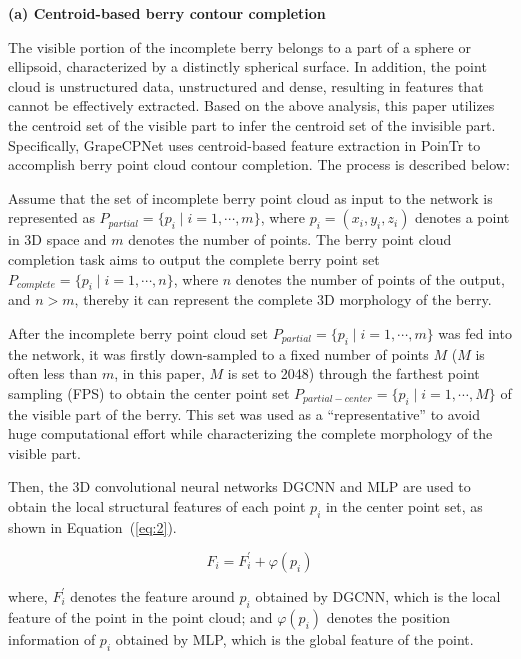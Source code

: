 \documentclass[12pt]{article}
\begin{document}
{\raggedright\textbf{(a) Centroid-based berry contour completion}}

The visible portion of the incomplete berry belongs to a part of a sphere or ellipsoid, characterized by a distinctly spherical surface. 
In addition, the point cloud is unstructured data, unstructured and dense, resulting in features that cannot be effectively extracted. 
Based on the above analysis, this paper utilizes the centroid set of the visible part to infer the centroid set of the invisible part. 
Specifically, GrapeCPNet uses centroid-based feature extraction in PoinTr \citep{yu_pointr_2021} to accomplish berry point cloud contour completion. The process is described below: 

Assume that the set of incomplete berry point cloud as input to the network is represented as $P_{partial}=\{p_i \mid i=1, \cdots, m \}$, where $p_i=(x_i,y_i,z_i)$ denotes a point in 3D space and $m$ denotes the number of points. 
The berry point cloud completion task aims to output the complete berry point set $P_{complete}=\{p_i \mid i=1, \cdots, n\}$, where $n$ denotes the number of points of the output, and $n > m$, thereby it can represent the complete 3D morphology of the berry.

After the incomplete berry point cloud set $P_{partial}=\{p_i \mid i=1,\cdots,m\}$ was fed into the network, it was firstly down-sampled to a fixed number of points $M$ ($M$ is often less than $m$, in this paper, $M$ is set to 2048) through the farthest point sampling (FPS) to obtain the center point set $P_{partial-center}=\{p_i \mid i=1, \cdots, M\}$ of the visible part of the berry. 
This set was used as a ``representative'' to avoid huge computational effort while characterizing the complete morphology of the visible part.

Then, the 3D convolutional neural networks DGCNN \citep{wang_dynamic_2019} and MLP \citep{tolstikhin_mlpmixer_2021} are used to obtain the local structural features of each point $p_i$ in the center point set, as shown in Equation~(\ref{eq:2}).

\begin{equation}
    F_i = F_{i}^{'} + \varphi(p_i)
    \label{eq:2}
\end{equation}

{\raggedright where, $F_{i}^{'}$ denotes the feature around $p_i$ obtained by DGCNN, which is the local feature of the point in the point cloud; and $\varphi(p_i)$ denotes the position information of $p_i$ obtained by MLP, which is the global feature of the point.}
\end{document}
